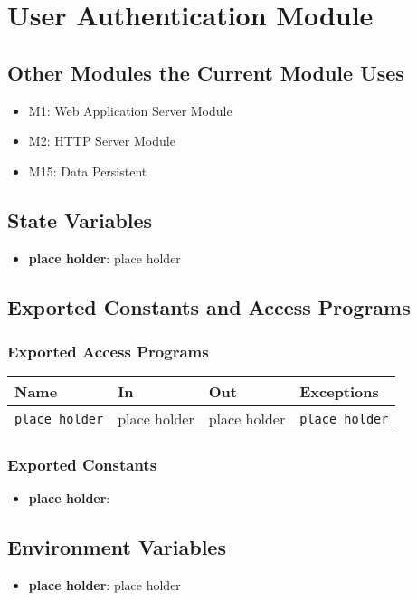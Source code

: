 \documentclass[12pt, titlepage]{article}
\begin{document}
\section{User Authentication Module}

\subsection{Other Modules the Current Module Uses}
\begin{itemize}
    \item M1: Web Application Server Module
    \item M2: HTTP Server Module
    \item M15: Data Persistent
\end{itemize}

\subsection{State Variables}
\begin{itemize}
    \item \textbf{place holder}: place holder
\end{itemize}

\subsection{Exported Constants and Access Programs}
\subsubsection{Exported Access Programs}
\begin{tabular}{|l|l|l|l|}
    \hline
    \textbf{Name} & \textbf{In} & \textbf{Out} & \textbf{Exceptions} \\
    \hline 
    \texttt{place holder} & place holder & place holder & \texttt{place holder}
    \\
    \hline
\end{tabular}

\subsubsection{Exported Constants}
\begin{itemize}
\item \textbf{place holder}:
\end{itemize}

\subsection{Environment Variables}
\begin{itemize}
\item \textbf{place holder}: place holder
\end{itemize}
\end{document}
